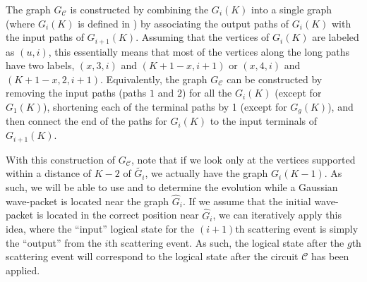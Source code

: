 \documentclass[../thesis-main/thesis-main]{subfiles}
\begin{document}
The graph $G_{\mathcal{C}}$ is constructed by combining the $G_i(K)$ into a single graph (where $G_i(K)$ is defined in ) by associating the output paths of $G_i(K)$ with the input paths of $G_{i+1}(K)$.  Assuming that the vertices of $G_i(K)$ are labeled as $(u,i)$, this essentially means that most of the vertices along the long paths have two labels, $(x,3, i)$ and $(K+1 -x,i+1)$ or $(x,4,i)$ and $(K+1-x,2,i+1)$.  Equivalently, the graph $G_{\mathcal{C}}$ can be constructed by removing the input paths (paths $1$ and $2$) for all the $G_i(K)$ (except for $G_1(K)$), shortening each of the terminal paths by 1 (except for $G_g(K)$), and then connect the end of the paths for $G_i(K)$ to the input terminals of $G_{i+1}(K)$.


With this construction of $G_{\mathcal{C}}$, note that if we look only at the vertices supported within a distance of $K-2$ of $\widetilde{G_i}$, we actually have the graph $G_i(K-1)$.  As such, we will be able to use  and  to determine the evolution while a Gaussian wave-packet is located near the graph $\widehat{G}_i$.  If we assume that the initial wave-packet is located in the correct position near $\widehat{G}_i$, we can iteratively apply this idea, where the ``input'' logical state for the $(i+1)$th scattering event is simply the ``output'' from the $i$th scattering event.  As such, the logical state after the $g$th scattering event will correspond to the logical state after the circuit $\mathcal{C}$ has been applied.  
\end{document}
